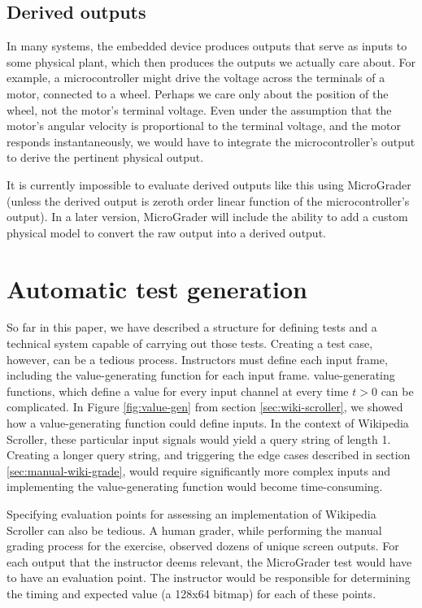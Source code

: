 \documentclass[12pt]{article}
\begin{document}
\subsection{Derived outputs}
\label{sec:derived-outputs}
In many systems, the embedded device produces outputs that serve as inputs to some physical plant, which then produces the outputs we actually care about.  For example, a microcontroller might drive the voltage across the terminals of a motor, connected to a wheel.  Perhaps we care only about the position of the wheel, not the motor's terminal voltage.  Even under the assumption that the motor's angular velocity is proportional to the terminal voltage, and the motor responds instantaneously, we would have to integrate the microcontroller's output to derive the pertinent physical output.

It is currently impossible to evaluate derived outputs like this using MicroGrader (unless the derived output is zeroth order linear function of the microcontroller's output).  In a later version, MicroGrader will include the ability to add a custom physical model to convert the raw output into a derived output.

\clearpage
\section{Automatic test generation}
So far in this paper, we have described a structure for defining tests and a technical system capable of carrying out those tests.  Creating a test case, however, can be a tedious process.  Instructors must define each input frame, including the value-generating function for each input frame.  value-generating functions, which define a value for every input channel at every time $t>0$ can be complicated.  In Figure \ref{fig:value-gen} from section \ref{sec:wiki-scroller}, we showed how a value-generating function could define inputs.  In the context of Wikipedia Scroller, these particular input signals would yield a query string of length 1.  Creating a longer query string, and triggering the edge cases described in section \ref{sec:manual-wiki-grade}, would require significantly more complex inputs and implementing the value-generating function would become time-consuming.

Specifying evaluation points for assessing an implementation of Wikipedia Scroller can also be tedious.  A human grader, while performing the manual grading process for the exercise, observed dozens of unique screen outputs.  For each output that the instructor deems relevant, the MicroGrader test would have to have an evaluation point.  The instructor would be responsible for determining the timing and expected value (a 128x64 bitmap) for each of these points.
\end{document}
